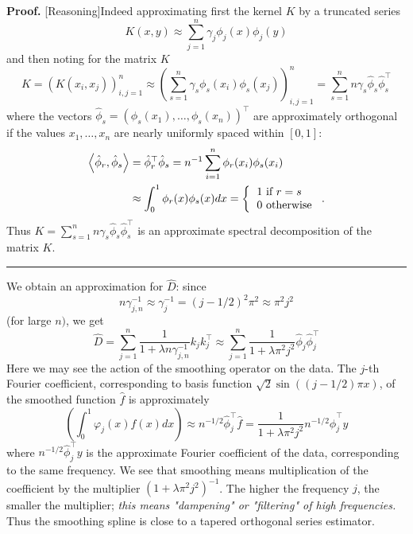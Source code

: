 \documentclass[11pt,twoside]{article}%
\theoremstyle{change}
\newenvironment{proof}[1][Proof]{\textbf{#1.} }{\ \rule{0.5em}{0.5em}}
\begin{document}
\begin{proof}
[Reasoning]Indeed approximating first the kernel $K$ by a truncated series
\[
K(x,y)\approx\sum_{j=1}^{n}\gamma_{j}\phi_{j}(x)\phi_{j}(y)
\]
and then noting for the matrix $K$
\[
K=\left(  K\left(  x_{i},x_{j}\right)  \right)  _{i,j=1}^{n}\approx\left(
\sum_{s=1}^{n}\gamma_{s}\phi_{s}(x_{i})\phi_{s}(x_{j})\right)  _{i,j=1}%
^{n}=\sum_{s=1}^{n}n\gamma_{s}\hat{\phi}_{s}\hat{\phi}_{s}^{\top}%
\]
where the vectors $\hat{\phi}_{s}=\left(  \phi_{s}\left(  x_{1}\right)
,\ldots,\phi_{s}\left(  x_{n}\right)  \right)  ^{\top}$ are approximately
orthogonal if the values $x_{1},\ldots,x_{n}$ are nearly uniformly spaced
within $[0,1]$:
\begin{align*}
\left\langle \hat{\phi}_{r},\hat{\phi}_{s}\right\rangle  & =\hat{\phi}%
_{r}^{\top}\hat{\phi}_{s}=n^{-1}\sum_{i=1}^{n}\phi_{r}(x_{i})\phi_{s}(x_{i})\\
& \approx\int_{0}^{1}\phi_{r}(x)\phi_{s}(x)dx=\left\{
\begin{tabular}
[c]{l}%
$1$ if $r=s$\\
$0$ otherwise
\end{tabular}
\right.  .
\end{align*}
Thus $K=\sum_{s=1}^{n}n\gamma_{s}\hat{\phi}_{s}\hat{\phi}_{s}^{\top}$ is an
approximate spectral decomposition of the matrix $K.$
\end{proof}

\bigskip\bigskip

We obtain an approximation for $\hat{D}$: since
\[
n\gamma_{j,n}^{-1}\approx\gamma_{j}^{-1}=\left(  j-1/2\right)  ^{2}\pi
^{2}\approx\pi^{2}j^{2}%
\]
(for large $n)$, we get
\[
\hat{D}=\sum_{j=1}^{n}\frac{1}{1+\lambda n\gamma_{j,n}^{-1}}k_{j}k_{j}^{\top
}\approx\sum_{j=1}^{n}\frac{1}{1+\lambda\pi^{2}j^{2}}\hat{\phi}_{j}\hat{\phi
}_{j}^{\top}%
\]
Here we may see the action of the smoothing operator on the data. The $j$-th
Fourier coefficient, corresponding to basis function $\sqrt{2}\sin\left(
\left(  j-1/2\right)  \pi x\right)  $, of the smoothed function $\hat{f}$ is
approximately
\[
\left(  \int_{0}^{1}\varphi_{j}(x)\hat{f}(x)dx\right)  \approx n^{-1/2}%
\hat{\phi}_{j}^{\top}\hat{f}=\frac{1}{1+\lambda\pi^{2}j^{2}}n^{-1/2}\hat{\phi
}_{j}^{\top}y
\]
where $n^{-1/2}\hat{\phi}_{j}^{\top}y$ is the approximate Fourier coefficient
of the data, corresponding to the same frequency. We see that smoothing means
multiplication of the coefficient by the multiplier $\left(  1+\lambda\pi
^{2}j^{2}\right)  ^{-1}$. The higher the frequency $j$, the smaller the
multiplier; \textit{this means "dampening" or "filtering" of high
frequencies.} Thus the smoothing spline is close to a tapered orthogonal
series estimator.
\end{document}
